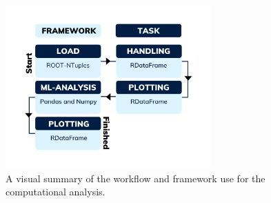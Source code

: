 \begin{figure}
  \centering
  \includegraphics[width=0.7\textwidth]{Figures/Illustrations/TaskFlow.png}
  \vspace{-1cm}
  \caption{A visual summary of the workflow and framework use for the 
  computational analysis. }
  \label{fig:WF}
\end{figure}
